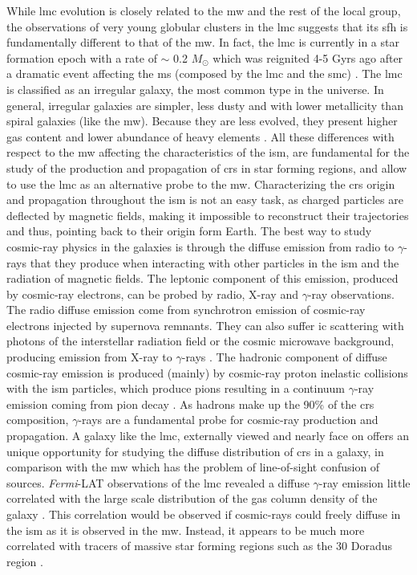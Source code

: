 \documentclass[main.tex]{subfiles}
\begin{document}
While \gls{lmc} evolution is closely related to the \gls{mw} and the rest of the local group, the observations of very young globular clusters in the \gls{lmc} suggests that its \gls{sfh} is fundamentally different to that of the \gls{mw}. In fact, the \gls{lmc} is currently in a star formation epoch with a rate of $\sim$ 0.2 $M_{\odot}$ which was reignited 4-5 Gyrs ago after a dramatic event affecting the \gls{ms} (composed by the \gls{lmc} and the \gls{smc}) \cite{2009SFHofLMC}. The \gls{lmc} is classified as an irregular galaxy, the most common type in the universe. In general, irregular galaxies are simpler, less dusty and with lower metallicity than spiral galaxies (like the \gls{mw}). Because they are less evolved, they present higher gas content and lower abundance of heavy elements \cite{2013InfrarredLMC}. All these differences with respect to the \gls{mw} affecting the characteristics of the \gls{ism}, are fundamental for the study of the production and propagation of \glspl{cr} in star forming regions, and allow to use the \gls{lmc} as an alternative probe to the \gls{mw}.
Characterizing the \glspl{cr} origin and propagation throughout the \gls{ism} is not an easy task, as charged particles are deflected by magnetic fields, making it impossible to reconstruct their trajectories and thus, pointing back to their origin form Earth. The best way to study cosmic-ray physics in the galaxies is through the diffuse emission from radio to $\gamma$-rays that they produce when interacting with other particles in the \gls{ism} and the radiation of magnetic fields. The leptonic component of this emission, produced by cosmic-ray electrons, can be probed by radio, X-ray and $\gamma$-ray observations. The radio diffuse emission come from synchrotron emission of cosmic-ray electrons injected by supernova remnants. They can also suffer \gls{ic} scattering with photons of the interstellar radiation field or the cosmic microwave background, producing emission from X-ray to $\gamma$-rays \cite{2008ICgammaray}. The hadronic component of diffuse cosmic-ray emission is produced (mainly) by cosmic-ray proton inelastic collisions with the \gls{ism} particles, which produce pions resulting in a continuum $\gamma$-ray emission coming from pion decay \cite{1963Pimesonsproducegammarays}. As hadrons make up the 90\% of the \glspl{cr} composition, $\gamma$-rays are a fundamental probe for cosmic-ray production and propagation. 
A galaxy like the \gls{lmc}, externally viewed and nearly face on offers an unique opportunity for studying the diffuse distribution of \glspl{cr} in a galaxy, in comparison with the \gls{mw} which has the problem of line-of-sight confusion of sources. \textit{Fermi}-LAT observations of the \gls{lmc} revealed a diffuse $\gamma$-ray emission little correlated with the large scale distribution of the gas column density of the galaxy \cite{2010FermiLATLMC11months}. This correlation would be observed if cosmic-rays could freely diffuse in the \gls{ism} as it is observed in the \gls{mw}. Instead, it appears to be much more correlated with tracers of massive star forming regions such as the 30 Doradus region \cite{2012CRinLMC30Doradus}.\\
\end{document}
